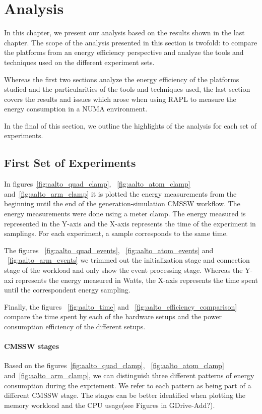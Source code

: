 \chapter{Analysis}



In this chapter, we present our analysis based on the results shown in the last chapter. The scope of the analysis presented in this section is twofold: to compare the
platforms from an energy efficiency perspective and analyze the tools and techniques used on the different experiment sets. 

Whereas the first two sections analyze the energy efficiency of the platforms
studied and the particularities of the tools and techniques used, the last 
section covers the results and issues which arose when using RAPL to measure 
the energy consumption in a NUMA environment.

In the final of this section, we outline the highlights of the analysis for
each set of experiments.

\section{First Set of Experiments}

In figures~\ref{fig:aalto_quad_clamp}, ~\ref{fig:aalto_atom_clamp} 
and~\ref{fig:aalto_arm_clamp} it is plotted the energy measurements from the beginning until the end of the generation-simulation CMSSW workflow. The energy measurements were done using a meter clamp. The energy measured is represented in the Y-axis and the X-axis represents the time of the experiment in samplings. For each experiment, a sample corresponds to the same time.

The figures ~\ref{fig:aalto_quad_events}, ~\ref{fig:aalto_atom_events} and ~\ref{fig:aalto_arm_events} we trimmed out the initialization stage and connection stage of the workload and only show the event processing stage. Whereas the Y-axi represents the energy measured in Watts, the X-axis represents the time spent until the correspondent energy sampling.

Finally, the figures ~\ref{fig:aalto_time} and ~\ref{fig:aalto_efficiency_comparison} compare the time spent by each of the hardware setups and the power consumption efficiency of the different setups.

\subsubsection*{CMSSW stages}
Based on the figures~\ref{fig:aalto_quad_clamp}, ~\ref{fig:aalto_atom_clamp} 
and~\ref{fig:aalto_arm_clamp}, we can distinguish three different patterns of energy consumption during the expriement. 
We refer to each pattern as being part of a different CMSSW stage. The stages can be better identified 
when plotting the memory workload and the CPU usage(see Figures in GDrive-Add?).

